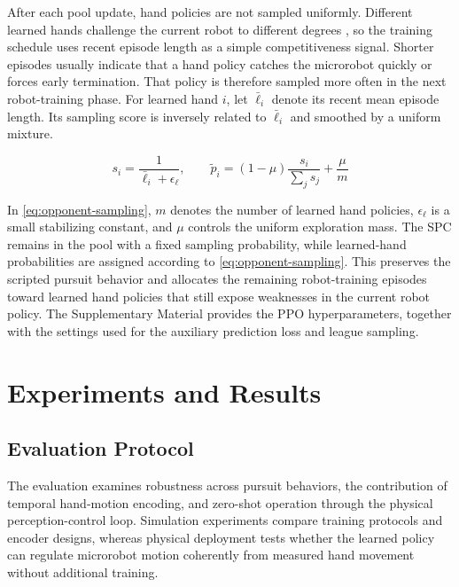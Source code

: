 \documentclass[journal,twoside,web]{ieeecolor2}
\begin{document}
After each pool update, hand policies are not sampled uniformly. Different learned hands challenge the current robot to different degrees \cite{huangOpponentAwareLeague2023}, so the training schedule uses recent episode length as a simple competitiveness signal. Shorter episodes usually indicate that a hand policy catches the microrobot quickly or forces early termination. That policy is therefore sampled more often in the next robot-training phase. For learned hand $i$, let $\bar{\ell}_i$ denote its recent mean episode length. Its sampling score is inversely related to $\bar{\ell}_i$ and smoothed by a uniform mixture.

\begin{equation}
s_i = \frac{1}{\bar{\ell}_i+\epsilon_{\ell}},
\qquad
\widetilde{p}_i = (1-\mu)\frac{s_i}{\sum_j s_j}+\frac{\mu}{m}
\label{eq:opponent-sampling}
\end{equation}

In \eqref{eq:opponent-sampling}, $m$ denotes the number of learned hand policies, $\epsilon_{\ell}$ is a small stabilizing constant, and $\mu$ controls the uniform exploration mass. The SPC remains in the pool with a fixed sampling probability, while learned-hand probabilities are assigned according to \eqref{eq:opponent-sampling}. This preserves the scripted pursuit behavior and allocates the remaining robot-training episodes toward learned hand policies that still expose weaknesses in the current robot policy. The Supplementary Material provides the PPO hyperparameters, together with the settings used for the auxiliary prediction loss and league sampling.

\section{Experiments and Results}
\label{sec:experiments-results}

\subsection{Evaluation Protocol}
\label{subsec:simulation-protocol}
The evaluation examines robustness across pursuit behaviors, the contribution of temporal hand-motion encoding, and zero-shot operation through the physical perception-control loop. Simulation experiments compare training protocols and encoder designs, whereas physical deployment tests whether the learned policy can regulate microrobot motion coherently from measured hand movement without additional training.
\end{document}
